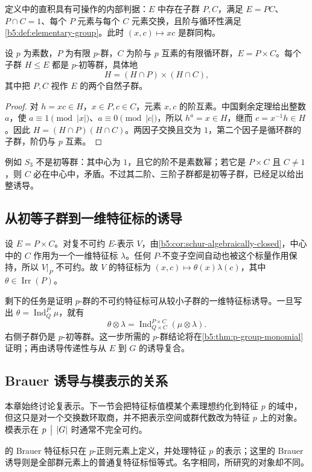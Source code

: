 定义中的直积具有可操作的内部判据：\(E\) 中存在子群 \(P,C\)，满足 \(E=PC\)、\(P\cap C=1\)、每个 \(P\) 元素与每个 \(C\) 元素交换，且阶与循环性满足\cref{b5:def:elementary-group}。此时 \((x,c)\mapsto xc\) 是群同构。

\begin{proposition}\label{b5:prop:elementary-subgroups}
	设 \(p\) 为素数，\(P\) 为有限 \(p\)-群，\(C\) 为阶与 \(p\) 互素的有限循环群，\(E=P\times C\)。每个子群 \(H\le E\) 都是 \(p\)-初等群，具体地
	\[
		H=(H\cap P)\times(H\cap C),
	\]
	其中把 \(P,C\) 视作 \(E\) 的两个自然子群。
\end{proposition}
\begin{proof}
	对 \(h=xc\in H\)，\(x\in P,c\in C\)，元素 \(x,c\) 的阶互素。中国剩余定理给出整数 \(a\)，使 \(a\equiv1\pmod{|x|}\)、\(a\equiv0\pmod{|c|}\)，所以 \(h^a=x\in H\)，继而 \(c=x^{-1}h\in H\)。因此 \(H=(H\cap P)(H\cap C)\)。两因子交换且交为 \(1\)，第二个因子是循环群的子群，阶仍与 \(p\) 互素。
\end{proof}

例如 \(S_3\) 不是初等群：其中心为 \(1\)，且它的阶不是素数幂；若它是 \(P\times C\) 且 \(C\ne1\)，则 \(C\) 必在中心中，矛盾。不过其二阶、三阶子群都是初等子群，已经足以给出整诱导。

\subsection{从初等子群到一维特征标的诱导}
\label{b5:subsec:0503:05}

设 \(E=P\times C\)。对复不可约 \(E\)-表示 \(V\)，由\cref{b5:cor:schur-algebraically-closed}，中心中的 \(C\) 作用为一个一维特征标 \(\lambda\)。任何 \(P\)-不变子空间自动也被这个标量作用保持，所以 \(V|_P\) 不可约。故 \(V\) 的特征标为 \((x,c)\mapsto\theta(x)\lambda(c)\)，其中 \(\theta\in\operatorname{Irr}(P)\)。

\ProseParagraphBreak
剩下的任务是证明 \(p\)-群的不可约特征标可从较小子群的一维特征标诱导。一旦写出 \(\theta=\operatorname{Ind}_Q^P\mu\)，就有
\[
	\theta\otimes\lambda =\operatorname{Ind}_{Q\times C}^{P\times C}(\mu\otimes\lambda).
\]
右侧子群仍是 \(p\)-初等群。这一步所需的 \(p\)-群结论将在\cref{b5:thm:p-group-monomial}证明；再由诱导传递性与从 \(E\) 到 \(G\) 的诱导复合。

\subsection{Brauer 诱导与模表示的关系}
\label{b5:subsec:0503:06}

本章始终讨论复表示。下一节会把特征标值模某个素理想约化到特征 \(p\) 的域中，但这只是对一个交换数环取商，并不把表示空间或群代数改为特征 \(p\) 上的对象。模表示在 \(p\,\bigm\vert\,|G|\) 时通常不完全可约。

\ProseParagraphBreak
{}的 Brauer 特征标只在 \(p\)-正则元素上定义，并处理特征 \(p\) 的表示；这里的 Brauer 诱导则是全部群元素上的普通复特征标恒等式。名字相同，所研究的对象却不同。
